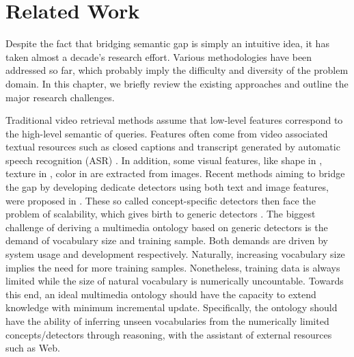 \chapter{Related Work}
\label{chp:related_work} Despite the fact that bridging semantic gap
is simply an intuitive idea, it has taken almost a decade's research
effort. Various methodologies have been addressed so far, which
probably imply the difficulty and diversity of the problem domain.
In this chapter, we briefly review the existing approaches and
outline the major research challenges.

Traditional video retrieval methods assume that low-level features
correspond to the high-level semantic of queries. Features often
come from video associated textual resources such as closed captions
and transcript generated by automatic speech recognition (ASR)
\cite{M.Brown:ACMM:1995,B.Adams:TREC:2002}. In addition, some visual
features, like shape in \cite{A.Del.Bimbo:IEEETPAMI:1997}, texture
in \cite{W.Ma:MS:1999}, color in \cite{Th.Gevers:IEEETIP:2000} are
extracted from images. Recent methods aiming to bridge the gap by
developing dedicate detectors using both text and image features,
were proposed in
\cite{R.Lienhart:IEEECMCS:1997,J.R.Smith:IEEEMM:1997,Y.Rui:ACMM:2000}.
These so called concept-specific detectors then face the problem of
scalability, which gives birth to generic detectors
\cite{MilindR.Naphade:IEEEICOME:2000,A.Amir:TRECVID:2003,CeesG.M.Snoek:ACMMM:2006}.
The biggest challenge of deriving a multimedia ontology based on
generic detectors is the demand of vocabulary size and training
sample. Both demands are driven by system usage and development
respectively. Naturally, increasing vocabulary size implies the need
for more training samples. Nonetheless, training data is always
limited while the size of natural vocabulary is numerically
uncountable. Towards this end, an ideal multimedia ontology should
have the capacity to extend knowledge with minimum incremental
update. Specifically, the ontology should have the ability of
inferring unseen vocabularies from the numerically limited
concepts/detectors through reasoning, with the assistant of external
resources such as Web.

